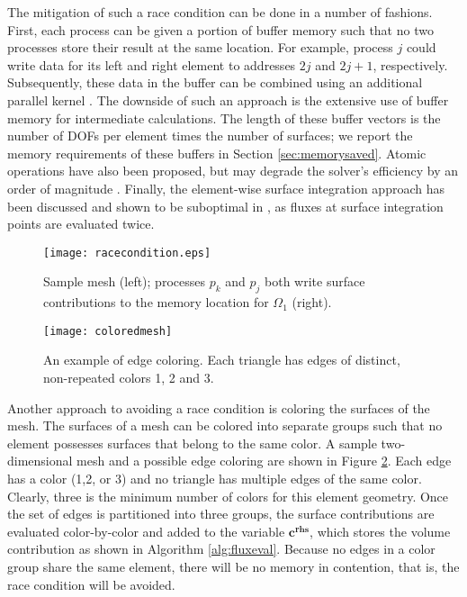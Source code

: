 \documentclass[12pt]{article}
\begin{document}
The mitigation of such a race condition can be done in a number of fashions.  First, each process can be given a portion of buffer memory such that no two processes store their result at the same location.  For example, process $j$ could write data for its left and right element to addresses $2j$ and $2j+1$, respectively.  Subsequently, these data in the buffer can be combined using an additional parallel kernel \cite{giuliani, nodaldg, corrigan}. The downside of such an approach is the extensive use of buffer memory for intermediate calculations.  The length of these buffer vectors is the number of DOFs per element times the number of surfaces; we report the memory requirements of these buffers in Section \ref{sec:memorysaved}.  Atomic operations have also been proposed, but may degrade the solver's efficiency by an order of magnitude \cite{giuliani}.  Finally, the element-wise surface integration approach has been discussed and shown to be suboptimal in \cite{giuliani,luo2, corrigan}, as fluxes at surface integration points are evaluated twice.

\begin{figure}
	\centering
	\texttt{[image: racecondition.eps]}
	\caption{Sample mesh (left); processes $p_k$ and $p_{j}$ both write surface contributions to the memory location for $\Omega_1$ (right).}
	\label{fig:racecondition}
\end{figure}

\begin{figure}
	\centering
	\texttt{[image: coloredmesh]}
	\caption{An example of edge coloring.  Each triangle has edges of distinct, non-repeated colors 1, 2 and 3.}
	\label{fig:mesh}
\end{figure}


Another approach to avoiding a race condition is coloring the surfaces of the mesh.  The surfaces of a mesh can be colored into separate groups such that no element possesses surfaces that belong to the same color.  A sample two-dimensional mesh and a possible edge coloring are shown in Figure \ref{fig:mesh}.  Each edge has a color (1,2, or 3) and no triangle has multiple edges of the same color.  Clearly, three is the minimum number of colors for this element geometry.  Once the set of edges is partitioned into three groups, the surface contributions are evaluated color-by-color and added to the variable $\mathbf{c^\text{rhs}}$, which stores the volume contribution as shown in Algorithm \ref{alg:fluxeval}.  
Because no edges in a color group share the same element, there will be no memory in contention, that is, the race condition will be avoided.
\end{document}
